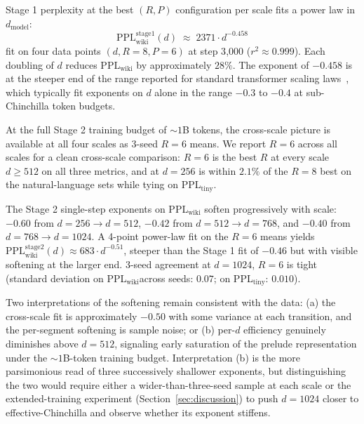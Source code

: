 \documentclass{article}
\newcommand{\pplwiki}{PPL$_\text{wiki}$}
\newcommand{\ppltiny}{PPL$_\text{tiny}$}
\begin{document}
Stage 1 perplexity at the best $(R, P)$ configuration per scale fits a power law in $d_\text{model}$:
\[
\text{PPL}_\text{wiki}^\text{stage1}(d) \;\approx\; 2371 \cdot d^{-0.458}
\]
fit on four data points $(d, R{=}8, P{=}6)$ at step 3{,}000 ($r^2 \approx 0.999$). Each doubling of $d$ reduces \pplwiki{} by approximately $28\%$. The exponent of $-0.458$ is at the steeper end of the range reported for standard transformer scaling laws~\citep{kaplan2020scaling,hoffmann2022chinchilla}, which typically fit exponents on $d$ alone in the range $-0.3$ to $-0.4$ at sub-Chinchilla token budgets.

At the full Stage 2 training budget of $\sim 1$B tokens, the cross-scale picture is available at all four scales as 3-seed $R{=}6$ means. We report $R{=}6$ across all scales for a clean cross-scale comparison: $R{=}6$ is the best $R$ at every scale $d \geq 512$ on all three metrics, and at $d{=}256$ is within $2.1\%$ of the $R{=}8$ best on the natural-language sets while tying on \ppltiny.

The Stage 2 single-step exponents on \pplwiki{} soften progressively with scale: $-0.60$ from $d{=}256 \to d{=}512$, $-0.42$ from $d{=}512 \to d{=}768$, and $-0.40$ from $d{=}768 \to d{=}1024$. A 4-point power-law fit on the $R{=}6$ means yields $\text{PPL}_\text{wiki}^\text{stage2}(d) \approx 683 \cdot d^{-0.51}$, steeper than the Stage 1 fit of $-0.46$ but with visible softening at the larger end. 3-seed agreement at $d{=}1024$, $R{=}6$ is tight (standard deviation on \pplwiki across seeds: $0.07$; on \ppltiny: $0.010$).

Two interpretations of the softening remain consistent with the data: (a) the cross-scale fit is approximately $-0.50$ with some variance at each transition, and the per-segment softening is sample noise; or (b) per-$d$ efficiency genuinely diminishes above $d{=}512$, signaling early saturation of the prelude representation under the $\sim 1$B-token training budget. Interpretation (b) is the more parsimonious read of three successively shallower exponents, but distinguishing the two would require either a wider-than-three-seed sample at each scale or the extended-training experiment (Section~\ref{sec:discussion}) to push $d{=}1024$ closer to effective-Chinchilla and observe whether its exponent stiffens.
\end{document}
